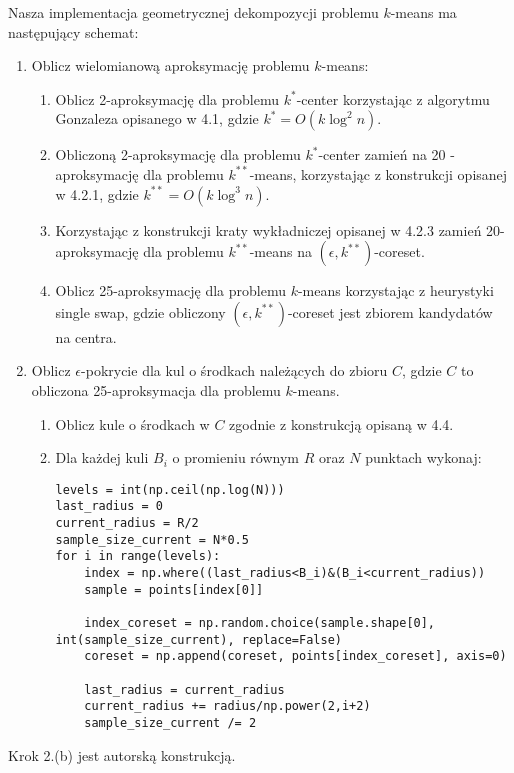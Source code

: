 \noindent
Nasza implementacja geometrycznej dekompozycji problemu $k$-means ma następujący schemat:
\begin{enumerate}
    \item Oblicz wielomianową aproksymację problemu $k$-means:
    \begin{enumerate}
        \item Oblicz 2-aproksymację dla problemu $k^{*}$-center korzystając z algorytmu Gonzaleza opisanego w 4.1, gdzie $k^{*} = O(k \log^2 n)$.
        \item Obliczoną 2-aproksymację dla problemu $k^{*}$-center zamień na 20 - aproksymację dla problemu $k^{**}$-means, korzystając z konstrukcji opisanej w 4.2.1, gdzie $k^{**} = O(k \log^3 n)$.
        \item Korzystając z konstrukcji kraty wykładniczej opisanej w 4.2.3 zamień 20-aproksymację dla problemu $k^{**}$-means na $(\epsilon, k^{**})$-coreset.
        \item Oblicz 25-aproksymację dla problemu $k$-means korzystając z heurystyki single swap, gdzie obliczony $(\epsilon, k^{**})$-coreset jest zbiorem kandydatów na centra.
    \end{enumerate}
    \item Oblicz $\epsilon$-pokrycie dla kul o środkach należących do zbioru $C$, gdzie $C$ to obliczona 25-aproksymacja dla problemu $k$-means.
    \begin{enumerate}
        \item Oblicz kule o środkach w $C$ zgodnie z konstrukcją opisaną w 4.4.
        \item Dla każdej kuli $B_{i}$ o promieniu równym $R$ oraz $N$ punktach wykonaj:
            \lstset{language=python}
            \begin{lstlisting}
levels = int(np.ceil(np.log(N)))
last_radius = 0
current_radius = R/2
sample_size_current = N*0.5
for i in range(levels):
    index = np.where((last_radius<B_i)&(B_i<current_radius))
    sample = points[index[0]]

    index_coreset = np.random.choice(sample.shape[0], int(sample_size_current), replace=False)
    coreset = np.append(coreset, points[index_coreset], axis=0)

    last_radius = current_radius
    current_radius += radius/np.power(2,i+2)
    sample_size_current /= 2
            \end{lstlisting}
    \end{enumerate}
\end{enumerate}
\noindent
Krok 2.(b) jest autorską konstrukcją.
